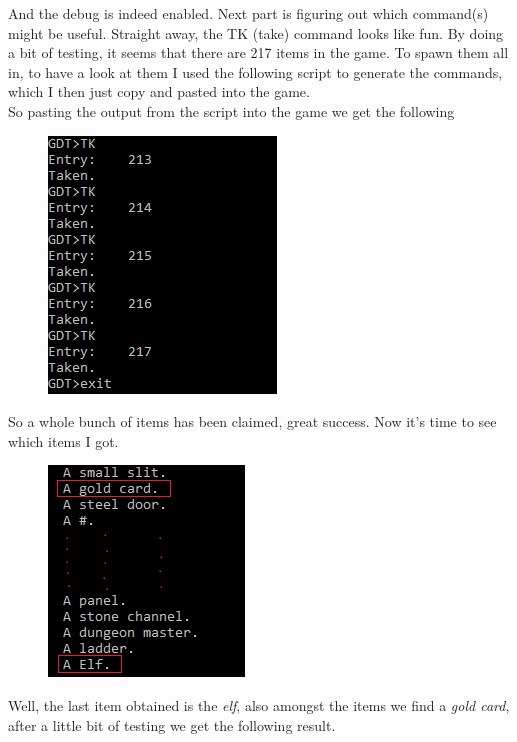 \documentclass[writeup.tex]{subfiles}
\begin{document}
			And the debug is indeed enabled. Next part is figuring out which command(s) might be useful. Straight away, the TK (take) command looks like fun. By doing a bit of testing, it seems that there are 217 items in the game. To spawn them all in, to have a look at them I used the following script to generate the commands, which I then just copy and pasted into the game.\\
						
			
			
			
			So pasting the output from the script into the game we get the following
				
			\begin{figure}[H]
				\centering
				\includegraphics[scale=1]{"screenshots/pwns/Site 2 - gdt spawn items"}
			\end{figure}
			
			So a whole bunch of items has been claimed, great success. Now it's time to see which items I got.
			
			\begin{figure}[H]
				\centering
				\includegraphics[scale=1]{"screenshots/pwns/Site 2 - inventory"}
			\end{figure}
			
			Well, the last item obtained is the \textit{elf}, also amongst the items we find a \textit{gold card}, after a little bit of testing we get the following result.
			
\end{document}
